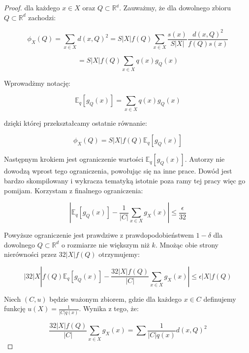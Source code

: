 \begin{proof}
\noindent
dla każdego $x \in X$ oraz $Q \subset \mathbb{R^d}$.
Zauważmy, że dla dowolnego zbioru  $Q \subset \mathbb{R}^{d}$ zachodzi:

\begin{equation}
    \phi_{X}(Q) = \sum_{x \in X} d(x, Q)^2 = S|X|f(Q) \sum_{x \in X} \frac{s(x)}{S|X|} \frac{d(x, Q)^2}{f(Q)s(x)}
\end{equation}

\begin{equation}
    =  S|X|f(Q) \sum_{x \in X} q(x) g_{Q}(x)
\end{equation}

\noindent
Wprowadżmy notację:

\begin{equation}
    \mathbb{E}_q[g_{Q}(x)] = \sum _{x \in X} q(x) g_{Q}(x)
\end{equation}

\noindent
dzięki której przekształcamy ostatnie równanie:

\begin{equation}
    \phi_{X}(Q) = S|X|f(Q)\mathbb{E}_q[g_{Q}(x)]
\end{equation}

\noindent
Następnym krokiem jest ograniczenie wartości $\mathbb{E}_q[g_{Q}(x)]$.
Autorzy \cite{bachem2017scalable} nie dowodzą wprost tego ograniczenia, powołując się na inne prace.
Dowód jest bardzo skompilowany i wykracza tematyką istotnie poza ramy tej pracy więc go pomijam.
Korzystam z finalnego ograniczenia:

\begin{equation}
    |\mathbb{E}_q[g_{Q}(x)] - \frac{1}{|C|} \sum_{x \in X}g_{X}(x)| \leq \frac{\epsilon}{32}
\end{equation}

\noindent
Powyższe ograniczenie jest prawdziwe z prawdopodobieństwem $1 - \delta$ dla dowolnego $Q \subset \mathbb{R}^{d}$ o rozmiarze nie większym niż $k$.
Mnożąc obie strony nierówności przez $32|X|f(Q)$ otrzymujemy:

\begin{equation}
    |32|X|f(Q)\mathbb{E}_q[g_{Q}(x)] - \frac{32|X|f(Q)}{|C|} \sum_{x \in X}g_{X}(x)| \leq \epsilon|X|f(Q)
\end{equation}

\noindent
Niech $(C, u)$ będzie ważonym zbiorem, gdzie dla każdego $x \in C$ definujemy funkcję $u(X) = \frac{1}{|C|q(x)}$.
Wynika z tego, że:

\begin{equation}
    \frac{32|X|f(Q)}{|C|} \sum_{x \in X}g_{X}(x) = \sum \frac{1}{|C|q(x)} d(x, Q)^2
\end{equation}


\end{proof}
